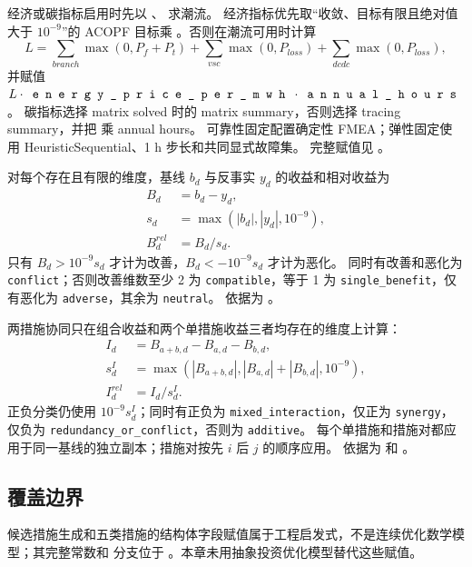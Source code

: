 经济或碳指标启用时先以 、 求潮流。
经济指标优先取“收敛、目标有限且绝对值大于 $10^{-9}$”的 ACOPF 目标乘
。否则在潮流可用时计算
\begin{equation}
 L=\sum_{branch}\max(0,P_f+P_t)
   +\sum_{vsc}\max(0,P_{loss})+\sum_{dcdc}\max(0,P_{loss}),
\end{equation}
并赋值 $L\cdot\fld{energy\_price\_per\_mwh}\cdot\fld{annual\_hours}$。
碳指标选择 matrix solved 时的 matrix summary，否则选择 tracing summary，并把
 乘 annual hours。
可靠性固定配置确定性 FMEA；弹性固定使用 HeuristicSequential、1 h 步长和共同显式故障集。
完整赋值见 。

对每个存在且有限的维度，基线 $b_d$ 与反事实 $y_d$ 的收益和相对收益为
\begin{align}
 B_d&=b_d-y_d,\\
 s_d&=\max(|b_d|,|y_d|,10^{-9}),\\
 B_d^{rel}&=B_d/s_d.
\end{align}
只有 $B_d>10^{-9}s_d$ 才计为改善，$B_d<-10^{-9}s_d$ 才计为恶化。
同时有改善和恶化为 \texttt{conflict}；否则改善维数至少 2 为 \texttt{compatible}，等于 1
为 \texttt{single\_benefit}，仅有恶化为 \texttt{adverse}，其余为 \texttt{neutral}。
依据为 。

两措施协同只在组合收益和两个单措施收益三者均存在的维度上计算：
\begin{align}
 I_d&=B_{a+b,d}-B_{a,d}-B_{b,d},\\
 s_d^I&=\max(|B_{a+b,d}|,|B_{a,d}|+|B_{b,d}|,10^{-9}),\\
 I_d^{rel}&=I_d/s_d^I.
\end{align}
正负分类仍使用 $10^{-9}s_d^I$；同时有正负为 \texttt{mixed\_interaction}，仅正为
\texttt{synergy}，仅负为 \texttt{redundancy\_or\_conflict}，否则为 \texttt{additive}。
每个单措施和措施对都应用于同一基线的独立副本；措施对按先 $i$ 后 $j$ 的顺序应用。
依据为  和
。

\subsection{覆盖边界}

候选措施生成和五类措施的结构体字段赋值属于工程启发式，不是连续优化数学模型；其完整常数和
分支位于 。本章未用抽象投资优化模型替代这些赋值。
